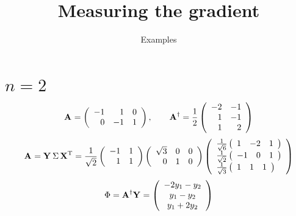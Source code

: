 \documentclass[10pt]{article}
\title{Measuring the gradient}
\author{Examples}
\begin{document}
\maketitle

\section{$n=2$}
\begin{equation}
    \A{}=
\left(
\begin{array}{rrr}
 -1 & 1 & 0 \\
 0 & -1 & 1
\end{array}
\right), \qquad
    \A{\dagger}=\frac{1}{2}
\left(
\begin{array}{rr}
 -2 & -1 \\
 1 & -1 \\
 1 & 2
\end{array}
\right)
\end{equation}
\begin{equation}
  \A{}=\Y{}\,\Sigma\,\X{T} =
\frac{1}{\sqrt{2}}
\left(
\begin{array}{rr}
 -1 & 1 \\
 1 & 1
\end{array}
\right)\left(
\begin{array}{rrr}
 \sqrt{3} & 0 & 0 \\
 0 & 1 & 0
\end{array}
\right)
\left(
\begin{array}{l}
 \frac{1}{\sqrt{6}} \mat{ccc}{1&-2&1} \\
 \frac{1}{\sqrt{2}} \mat{ccc}{-1&0&1} \\
 \frac{1}{\sqrt{3}} \mat{ccc}{1&1&1}
\end{array}
\right)
\end{equation}
\begin{equation}
  \Phi=\A{\dagger}\Y{}=
\mat{c}{-2 y_1-y_2\\y_1-y_2\\y_1+2 y_2}
\end{equation}

\end{document}
